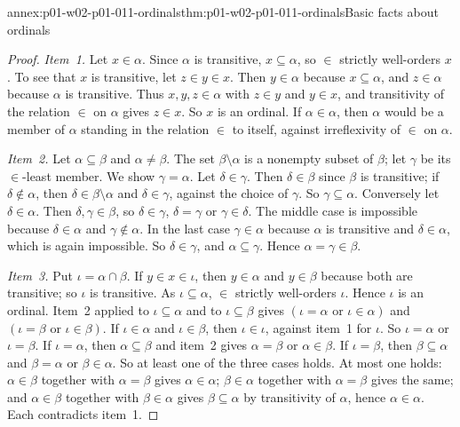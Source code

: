 \begin{annexitem}{annex:p01-w02-p01-011-ordinals}{thm:p01-w02-p01-011-ordinals}{Basic facts about ordinals}
\begin{proof}
\emph{Item~1.} Let \(x\in\alpha\). Since \(\alpha\) is transitive,
\(x\subseteq\alpha\), so \(\in\) strictly well-orders \(x\). To see that
\(x\) is transitive, let \(z\in y\in x\). Then \(y\in\alpha\) because
\(x\subseteq\alpha\), and \(z\in\alpha\) because \(\alpha\) is transitive.
Thus \(x,y,z\in\alpha\) with \(z\in y\) and \(y\in x\), and transitivity of
the relation \(\in\) on \(\alpha\) gives \(z\in x\). So \(x\) is an ordinal.
If \(\alpha\in\alpha\), then \(\alpha\) would be a member of \(\alpha\)
standing in the relation \(\in\) to itself, against irreflexivity of \(\in\)
on \(\alpha\).

\emph{Item~2.} Let \(\alpha\subseteq\beta\) and \(\alpha\ne\beta\). The set
\(\beta\setminus\alpha\) is a nonempty subset of \(\beta\); let \(\gamma\) be
its \(\in\)-least member. We show \(\gamma=\alpha\). Let \(\delta\in\gamma\).
Then \(\delta\in\beta\) since \(\beta\) is transitive; if \(\delta\notin\alpha\),
then \(\delta\in\beta\setminus\alpha\) and \(\delta\in\gamma\), against the
choice of \(\gamma\). So \(\gamma\subseteq\alpha\). Conversely let
\(\delta\in\alpha\). Then \(\delta,\gamma\in\beta\), so \(\delta\in\gamma\),
\(\delta=\gamma\) or \(\gamma\in\delta\). The middle case is impossible
because \(\delta\in\alpha\) and \(\gamma\notin\alpha\). In the last case
\(\gamma\in\alpha\) because \(\alpha\) is transitive and \(\delta\in\alpha\),
which is again impossible. So \(\delta\in\gamma\), and
\(\alpha\subseteq\gamma\). Hence \(\alpha=\gamma\in\beta\).

\emph{Item~3.} Put \(\iota=\alpha\cap\beta\). If \(y\in x\in\iota\), then
\(y\in\alpha\) and \(y\in\beta\) because both are transitive; so \(\iota\) is
transitive. As \(\iota\subseteq\alpha\), \(\in\) strictly well-orders
\(\iota\). Hence \(\iota\) is an ordinal. Item~2 applied to
\(\iota\subseteq\alpha\) and to \(\iota\subseteq\beta\) gives
\((\iota=\alpha\text{ or }\iota\in\alpha)\) and
\((\iota=\beta\text{ or }\iota\in\beta)\). If \(\iota\in\alpha\) and
\(\iota\in\beta\), then \(\iota\in\iota\), against item~1 for \(\iota\). So
\(\iota=\alpha\) or \(\iota=\beta\). If \(\iota=\alpha\), then
\(\alpha\subseteq\beta\) and item~2 gives \(\alpha=\beta\) or
\(\alpha\in\beta\). If \(\iota=\beta\), then \(\beta\subseteq\alpha\) and
\(\beta=\alpha\) or \(\beta\in\alpha\). So at least one of the three cases
holds. At most one holds: \(\alpha\in\beta\) together with \(\alpha=\beta\)
gives \(\alpha\in\alpha\); \(\beta\in\alpha\) together with \(\alpha=\beta\)
gives the same; and \(\alpha\in\beta\) together with \(\beta\in\alpha\) gives
\(\beta\subseteq\alpha\) by transitivity of \(\alpha\), hence
\(\alpha\in\alpha\). Each contradicts item~1.


\end{proof}
\end{annexitem}
